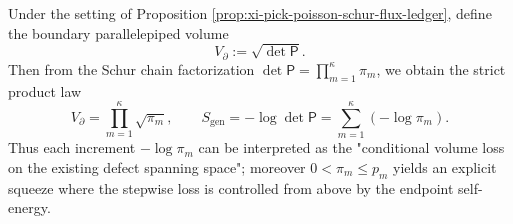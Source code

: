 
\begin{remark}[Conditional Flux as Conditional Volume: \texorpdfstring{$V_{\partial}=\prod_m\sqrt{\pi_m}$}{Vpartial=prod sqrt(pi_m)}]\label{rem:xi-pick-poisson-schur-conditional-volume}
Under the setting of Proposition \ref{prop:xi-pick-poisson-schur-flux-ledger}, define the boundary parallelepiped volume
\[
V_{\partial}:=\sqrt{\det\mathsf P}.
\]
Then from the Schur chain factorization \(\det\mathsf P=\prod_{m=1}^{\kappa}\pi_m\), we obtain the strict product law
\[
\boxed{\;
V_{\partial}=\prod_{m=1}^{\kappa}\sqrt{\pi_m},\qquad
S_{\mathrm{gen}}=-\log\det\mathsf P=\sum_{m=1}^{\kappa}(-\log\pi_m).\;}
\]
Thus each increment \(-\log\pi_m\) can be interpreted as the "conditional volume loss on the existing defect spanning space"; moreover \(0<\pi_m\le p_m\) yields an explicit squeeze where the stepwise loss is controlled from above by the endpoint self-energy.
\end{remark}

